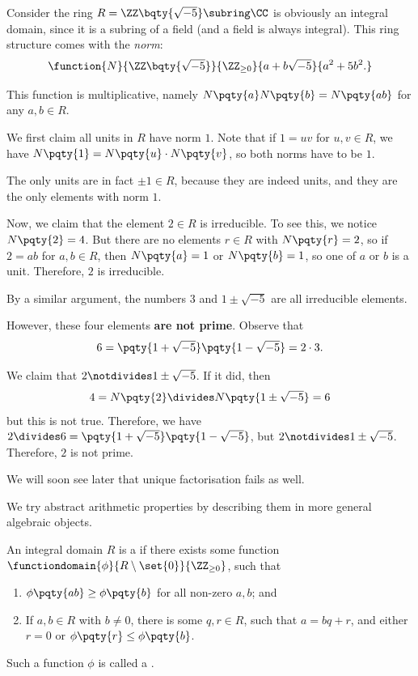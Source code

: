 \begin{example}
    \label{ex:irreducible-not-prime}%
    Consider the ring \(R = \ZZ\bqty{\sqrt{-5}} \subring \CC\) is obviously an integral domain, since it is a subring of a field (and a field is always integral). This ring structure comes with the \emph{norm}:
    \[
        \function{N}{\ZZ\bqty{\sqrt{-5}}}{\ZZ_{\geq 0}}{a + b \sqrt{-5}}{a^2 + 5 b^2.}
    \]

    This function is multiplicative, namely \(N\pqty{a} N\pqty{b} = N\pqty{ab}\) for any \(a, b \in R\).

    We first claim all units in \(R\) have norm \(1\). Note that if \(1 = uv\) for \(u, v \in R\), we have \(N\pqty{1} = N\pqty{u} \cdot N\pqty{v}\), so both norms have to be \(1\).

    The only units are in fact \(\pm 1 \in R\), because they are indeed units, and they are the only elements with norm \(1\). 

    Now, we claim that the element \(2 \in R\) is irreducible. To see this, we notice \(N\pqty{2} = 4\). But there are no elements \(r \in R\) with \(N\pqty{r} = 2\), so if \(2 = ab\) for \(a, b \in R\), then \(N\pqty{a} = 1\) or \(N\pqty{b} = 1\), so one of \(a\) or \(b\) is a unit. Therefore, \(2\) is irreducible.

    By a similar argument, the numbers \(3\) and \(1 \pm \sqrt{-5}\) are all irreducible elements.

    However, these four elements \textbf{are not prime}. Observe that
    \[
        6 = \pqty{1 + \sqrt{-5}} \pqty{1 - \sqrt{-5}} = 2 \cdot 3.
    \]

    We claim that \(2 \notdivides 1 \pm \sqrt{-5}\). If it did, then
    \[
        4 = N\pqty{2} \divides N\pqty{1 \pm \sqrt{-5}} = 6
    \]
    but this is not true. Therefore, we have \(2 \divides 6 = \pqty{1 + \sqrt{-5}} \pqty{1 - \sqrt{-5}}\), but \(2 \notdivides 1 \pm \sqrt{-5}\). Therefore, \(2\) is not prime.

    We will soon see later that unique factorisation fails as well.
\end{example}

We try abstract arithmetic properties by describing them in more general algebraic objects.

\begin{definition}
    \label{def:euclidean-domain}%
    An integral domain \(R\) is a  if there exists some function \(\functiondomain{\phi}{R \setminus \set{0}}{\ZZ_{\geq 0}}\), such that
    \begin{enumerate}
        \item \(\phi\pqty{ab} \geq \phi\pqty{b}\) for all non-zero \(a, b\); and
        \item If \(a, b \in R\) with \(b \neq 0\), there is some \(q, r \in R\), such that \(a = bq + r\), and either \(r = 0\) or \(\phi\pqty{r} \leq \phi\pqty{b}\).
    \end{enumerate}

    Such a function \(\phi\) is called a .
\end{definition}

